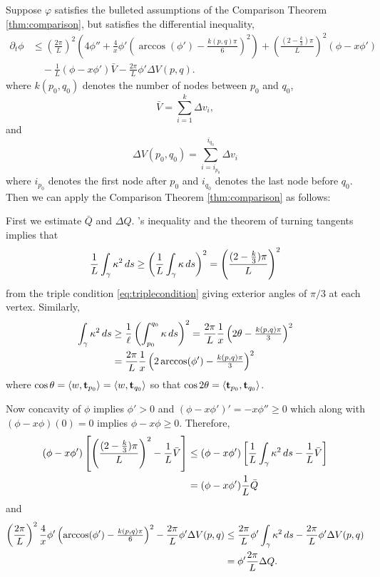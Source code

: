 \documentclass[11pt]{amsart}
\begin{document}
Suppose  $\varphi$ satisfies the bulleted assumptions of the Comparison Theorem \ref{thm:comparison}, but satisfies the differential inequality,
\[
\begin{split}
\partial_t \phi &\leq \left(\frac{2\pi}{L}\right)^2 \left(4 \phi'' + \frac{4}{x} \phi' \left(\arccos(\phi') - \tfrac{k(p,q)\pi}{6}\right)^2\right) + \left(\frac{(2 - \tfrac{k}{3})\pi}{L}\right)^2 \left(\phi - x \phi'\right) \\
&\quad - \frac{1}{L} (\phi - x\phi') \bar{V} - \frac{2\pi}{L} \phi' \Delta V (p,q).
\end{split}
\]
where $k(p_0, q_0)$ denotes the number of nodes between $p_0$ and $q_0$,
\[
\bar{V} = \sum_{i=1}^k \Delta v_i,
\]
and
\[
\Delta V (p_0, q_0) = \sum_{i = i_{p_0}}^{i_{q_0}} \Delta v_i
\]
where $i_{p_0}$ denotes the first node after $p_0$ and $i_{q_0}$ denotes the last node before $q_0$. Then we can apply the Comparison Theorem \ref{thm:comparison} as follows:

First we estimate $\bar{Q}$ and $\Delta Q$. \holder's inequality and the theorem of turning tangents implies that
\[
\frac{1}{L} \int_{\gamma} \operatorname{\kappa}^2 ds \geq \left(\frac{1}{L}\int_{\gamma} \operatorname{\kappa} ds\right)^2 = \left(\frac{(2 - \tfrac{k}{3})\pi}{L}\right)^2
\]
from the triple condition \eqref{eq:triplecondition} giving exterior angles of $\pi/3$ at each vertex. Similarly,
\[
\begin{split}
\int_{\gamma} \operatorname{\kappa}^2 ds &\geq \frac{1}{\ell} \left(\int_{p_0}^{q_0} \operatorname{\kappa} ds\right)^2 = \frac{2\pi}{L} \frac{1}{x} \left(2\theta - \tfrac{k(p,q)\pi}{3}\right)^2 \\
&= \frac{2\pi}{L} \frac{1}{x} \left(2\arccos(\phi') - \tfrac{k(p,q)\pi}{3}\right)^2
\end{split}
\]
where $\cos \theta = \langle{w},{\operatorname{\mathbf{t}}_{p_0}}\rangle = \langle{w},{\operatorname{\mathbf{t}}_{q_0}}\rangle$ so that $\cos 2 \theta = \langle{\operatorname{\mathbf{t}}_{p_0}},{\operatorname{\mathbf{t}}_{q_0}}\rangle$.

Now concavity of $\phi$ implies $\phi' > 0$ and $(\phi - x \phi')' = -x\phi'' \geq 0$ which along with $(\phi - x\phi) (0) = 0$ implies $\phi -x \phi \geq 0$. Therefore,
\[
\begin{split}
(\phi - x\phi') \left[\left(\frac{(2 - \tfrac{k}{3})\pi}{L}\right)^2 - \frac{1}{L} \bar{V}\right] &\leq (\phi - x\phi') \left[\frac{1}{L} \int_{\gamma} \operatorname{\kappa}^2 ds - \frac{1}{L} \bar{V}\right] \\
&= (\phi - x\phi') \frac{1}{L} \bar{Q}
\end{split}
\]
and
\[
\begin{split}
\left(\frac{2\pi}{L}\right)^2 \frac{4}{x} \phi' \left(\arccos(\phi') - \tfrac{k(p,q)\pi}{6}\right)^2 - \frac{2\pi}{L} \phi' \Delta V (p,q) &\leq \frac{2\pi}{L} \phi' \int_{\gamma} \operatorname{\kappa}^2 ds - \frac{2\pi}{L} \phi' \Delta V (p,q) \\
&= \phi' \frac{2\pi}{L} \Delta Q.
\end{split}
\]
\end{document}
